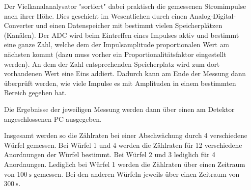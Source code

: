 Der Vielkanalanalysator "sortiert" dabei praktisch die gemessenen Stromimpulse nach ihrer Höhe.
Dies geschieht im Wesentlichen durch einen Analog-Digital-Converter und einen Datenspeicher mit bestimmt vielen
Speicherplätzen (Kanälen). Der ADC wird beim Eintreffen eines Impulses aktiv und bestimmt eine ganze Zahl, welche
dem der Impulsamplitude proportionalen Wert am nächsten kommt (dazu muss vorher ein Proportionalitätsfaktor eingestellt
werden). An dem der Zahl entsprechenden Speicherplatz wird zum dort vorhandenen Wert eine Eins addiert. Dadurch
kann am Ende der Messung dann überprüft werden, wie viele Impulse es mit Amplituden in einem bestimmten Bereich gegeben hat.

Die Ergebnisse der jeweiligen Messung werden dann über einen am Detektor angeschlossenen PC ausgegeben.

Insgesamt werden so die Zählraten bei einer Abschwächung durch 4 verschiedene Würfel gemessen.
Bei Würfel 1 und 4 werden die Zählraten für 12 verschiedene Anordnungen der Würfel bestimmt.
Bei Würfel 2 und 3 lediglich für 4 Anordnungen. Lediglich bei Würfel 1 werden die Zählraten über einen
Zeitraum von $\SI{100}{\second}$ gemessen. Bei den anderen Würfeln jeweils über einen
Zeitraum von $\SI{300}{\second}$.
